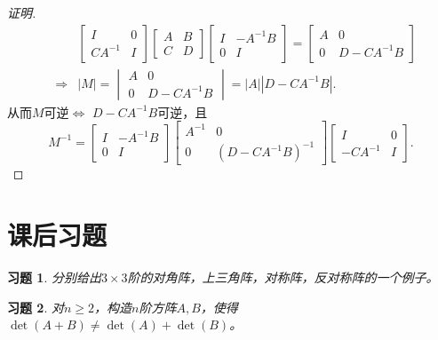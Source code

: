 \documentclass[a4paper]{book}
\newtheorem{ex}{习题}[chapter]
\begin{document}
\begin{proof}[证明]
\begin{eqnarray*}
& & \begin{bmatrix} I & 0 \\ CA^{-1} & I \end{bmatrix} \begin{bmatrix} A & B \\ C & D \end{bmatrix} \begin{bmatrix} I & -A^{-1}B \\ 0 & I \end{bmatrix} = \begin{bmatrix} A & 0 \\ 0 & D-CA^{-1}B \end{bmatrix} \\
& \Longrightarrow & |M| = \begin{vmatrix} A & 0 \\ 0 & D-CA^{-1}B \end{vmatrix} = |A||D-CA^{-1}B|.
\end{eqnarray*}
从而$M$可逆$\Longleftrightarrow$ $D-CA^{-1}B$可逆，且
$$M^{-1} = \begin{bmatrix} I & -A^{-1}B \\ 0 & I \end{bmatrix} \begin{bmatrix} A^{-1} & 0 \\ 0 & (D-CA^{-1}B)^{-1} \end{bmatrix} \begin{bmatrix} I & 0 \\ -CA^{-1} & I \end{bmatrix}.$$
\end{proof}


\section{课后习题}

\begin{ex} \label{ex:3.1}
分别给出$3\times3$阶的对角阵，上三角阵，对称阵，反对称阵的一个例子。
\end{ex}

\begin{ex} \label{ex:3.2}
对$n \geqslant 2$，构造$n$阶方阵$A,B$，使得$\det(A+B)\neq\det(A)+\det(B)$。
\end{ex}
\end{document}
